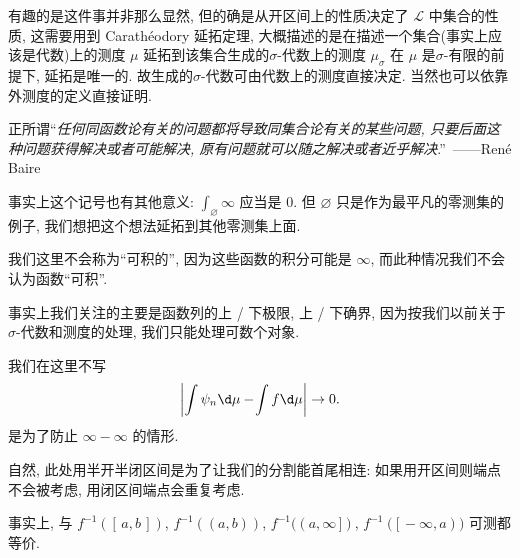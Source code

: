 \begin{alterendnote}
    有趣的是这件事并非那么显然, 但的确是从开区间上的性质决定了 $\mathcal L$ 中集合的性质, 这需要用到 Carathéodory 延拓定理, 大概描述的是在描述一个集合(事实上应该是代数)上的测度 $\mu $ 延拓到该集合生成的$\sigma $-代数上的测度 $\mu_{\sigma } $ 在 $\mu $ 是$\sigma $-有限的前提下, 延拓是唯一的. 故生成的$\sigma $-代数可由代数上的测度直接决定. 当然也可以依靠外测度的定义直接证明.
\end{alterendnote}
\begin{alterendnote}
    正所谓``\textit{任何同函数论有关的问题都将导致同集合论有关的某些问题, 只要后面这种问题获得解决或者可能解决, 原有问题就可以随之解决或者近乎解决}.''~------René Baire
\end{alterendnote}
\begin{alterendnote}
    事实上这个记号也有其他意义: $\int_\varnothing \infty$ 应当是 $0$. 但 $\varnothing$ 只是作为最平凡的零测集的例子, 我们想把这个想法延拓到其他零测集上面.
\end{alterendnote}
\begin{alterendnote}
    我们这里不会称为``可积的'', 因为这些函数的积分可能是 $\infty$, 而此种情况我们不会认为函数``可积''.
\end{alterendnote}
\begin{alterendnote}
    事实上我们关注的主要是函数列的上 / 下极限, 上 / 下确界, 因为按我们以前关于$\sigma $-代数和测度的处理, 我们只能处理可数个对象.
\end{alterendnote}
\begin{alterendnote}
    我们在这里不写\[\left| \int \psi _n\d \mu-\!\int f\d \mu  \right|\to 0. \]是为了防止 $\infty-\infty$ 的情形.
\end{alterendnote}
\begin{alterendnote}
    自然, 此处用半开半闭区间是为了让我们的分割能首尾相连: 如果用开区间则端点不会被考虑, 用闭区间端点会重复考虑.
\end{alterendnote}
\begin{alterendnote}
    事实上, 与 $f^{-1}([\,a,b\,])$, $f^{-1}((a,b))$, $f^{-1}((a,\infty\,])$, $f^{-1}([\,-\infty,a))$ 可测都等价.
\end{alterendnote}
